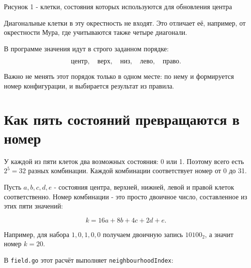 \documentclass[12pt,a4paper]{article}
\newcommand{\code}[1]{\texttt{#1}}
\newcommand{\sectiontitle}[1]{\section{\color{ink}#1}}
\begin{document}
\begin{center}

Рисунок 1 - клетки, состояния которых используются для обновления центра
\end{center}

Диагональные клетки в эту окрестность не входят. Это отличает её, например,
от окрестности Мура, где учитываются также четыре диагонали.

В программе значения идут в строго заданном порядке:

\[
\text{центр},\quad \text{верх},\quad \text{низ},\quad
\text{лево},\quad \text{право}.
\]

Важно не менять этот порядок только в одном месте: по нему и формируется
номер конфигурации, и выбирается результат из правила.

\sectiontitle{Как пять состояний превращаются в номер}

У каждой из пяти клеток два возможных состояния: 0 или 1. Поэтому всего
есть $2^5=32$ разных комбинации. Каждой комбинации соответствует номер
от 0 до 31.

Пусть $a,b,c,d,e$ - состояния центра, верхней, нижней, левой и правой
клеток соответственно. Номер комбинации - это просто двоичное число,
составленное из этих пяти значений:

\[
k = 16a + 8b + 4c + 2d + e.
\]

Например, для набора $1,0,1,0,0$ получаем двоичную запись $10100_2$,
а значит номер $k=20$.

В \code{field.go} этот расчёт выполняет \code{neighbourhoodIndex}:
\end{document}
